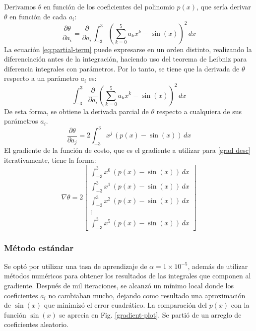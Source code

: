 \documentclass[conference]{IEEEtran}
\begin{document}
Derivamos $\theta$ en función de los coeficientes del polinomio $p(x)$, que sería derivar $\theta$ en función de cada $a_{i}$:
\begin{equation}
\frac{ \partial \theta }{ \partial a_{i} } = \frac{ \partial  }{ \partial a_{i} } \int_{-3}^{3}\left( \sum^{ 5 }_{ k = 0 }a_{k}x^{k}-\sin(x) \right)^{2}\, dx \label{eq:partial-term}
\end{equation}
La ecuación \eqref{eq:partial-term} puede expresarse en un orden distinto, realizando la diferenciación antes de la integración, haciendo uso del teorema de Leibniz para diferencia integrales con parámetros. Por lo tanto, se tiene que la derivada de $\theta$ respecto a un parámetro $a_i$ es:
\begin{equation}
\int_{-3}^{3}\frac{ \partial  }{ \partial a_{i} } \left( \sum^{ 5 }_{ k = 0 }a_{k}x^{k}-\sin(x) \right)^{2}\, dx \label{eq:flipped-partial-term}
\end{equation}
De esta forma, se obtiene la derivada parcial de $\theta$ respecto a cualquiera de sus parámetros $a_i$.
\begin{equation}
\frac{ \partial \theta }{ \partial a_{j} } = 2\int_{-3}^{3} x^{j}\,  (p(x)-\sin(x))\, dx \label{term:grad-component}
\end{equation}
El gradiente de la función de costo, que es el gradiente a utilizar para \ref{grad desc} iterativamente, tiene la forma:
\begin{equation}
\nabla\theta=2\begin{bmatrix}
\int_{-3}^{3} x^{0}\, (p(x)-\sin(x)) \, dx  \\
\int_{-3}^{3} x^{1}\, (p(x)-\sin(x)) \, dx  \\
\int_{-3}^{3} x^{2}\, (p(x)-\sin(x)) \, dx \\
\vdots \\
\int_{-3}^{3} x^{5}\, (p(x)-\sin(x)) \, dx
\end{bmatrix} \label{gradient}
\end{equation}

\subsubsection{Método estándar}\label{sec:standard-example}
Se optó por utilizar una tasa de aprendizaje de $\alpha=1\times10^{-5}$, además de utilizar métodos numéricos para obtener los resultados de las integrales que componen al gradiente. Después de mil iteraciones, se alcanzó un mínimo local donde los coeficientes $a_i$ no cambiaban mucho, dejando como resultado una aproximación de $\sin(x)$ que minimizó el error cuadrático. La comparación del $p(x)$ con la función $\sin(x)$ se aprecia en Fig. \ref{gradient-plot}. Se partió de un arreglo de coeficientes aleatorio.
\end{document}
